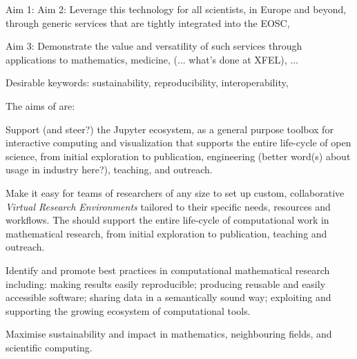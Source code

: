 
Aim 1: 
Aim 2: Leverage this technology for all scientists, in Europe and beyond, through generic services that are tightly integrated into the EOSC,

Aim 3: Demonstrate the value and versatility of such services through applications to mathematics, medicine, (... what's done at XFEL), ...

Desirable keywords: sustainability, reproducibility, interoperability,

The aims of \TheProject are:
\begin{compactenum}
\item \label{aim:collaboration}
  Support (and steer?) the Jupyter ecosystem, as a general purpose toolbox for interactive computing and visualization that supports the entire life-cycle of open science, from initial exploration to publication, engineering (better word(s) about usage in industry here?), teaching, and outreach.
\item \label{aim:vre} Make it easy for teams of researchers of any
  size to set up custom, collaborative \emph{Virtual Research
    Environments} tailored to their specific needs, resources and
  workflows. The \VREs should support the entire life-cycle of
  computational work in mathematical research, from initial
  exploration to publication, teaching and outreach.
\item \label{aim:sharing} Identify and promote best practices in
  computational mathematical research including: making results easily
  reproducible; producing reusable and easily accessible
  software; sharing data in a semantically sound way; exploiting and
  supporting the growing ecosystem of computational tools.
\item \label{aim:impact} Maximise sustainability and impact in
  mathematics, neighbouring fields, and scientific computing.
\end{compactenum}

